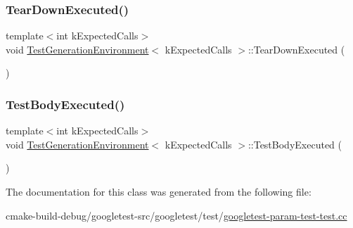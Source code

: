 \subsubsection{\texorpdfstring{TearDownExecuted()}{TearDownExecuted()}}
{\footnotesize\ttfamily template$<$int k\+Expected\+Calls$>$ \\
void \mbox{\hyperlink{classTestGenerationEnvironment}{Test\+Generation\+Environment}}$<$ k\+Expected\+Calls $>$\+::Tear\+Down\+Executed (\begin{DoxyParamCaption}{ }\end{DoxyParamCaption})\hspace{0.3cm}{\ttfamily [inline]}}

\mbox{\label{classTestGenerationEnvironment_a358a1d7cbefc3f9157f625f87dbde754}} 
\subsubsection{\texorpdfstring{TestBodyExecuted()}{TestBodyExecuted()}}
{\footnotesize\ttfamily template$<$int k\+Expected\+Calls$>$ \\
void \mbox{\hyperlink{classTestGenerationEnvironment}{Test\+Generation\+Environment}}$<$ k\+Expected\+Calls $>$\+::Test\+Body\+Executed (\begin{DoxyParamCaption}{ }\end{DoxyParamCaption})\hspace{0.3cm}{\ttfamily [inline]}}



The documentation for this class was generated from the following file\+:\begin{DoxyCompactItemize}
\item 
cmake-\/build-\/debug/googletest-\/src/googletest/test/\mbox{\hyperlink{googletest-param-test-test_8cc}{googletest-\/param-\/test-\/test.\+cc}}\end{DoxyCompactItemize}
